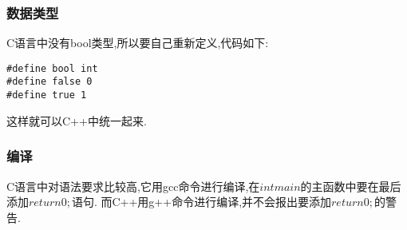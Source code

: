 \subsubsection{数据类型}
C语言中没有bool类型,所以要自己重新定义,代码如下:
\begin{lstlisting}[style=C]
#define bool int
#define false 0
#define true 1
\end{lstlisting}
这样就可以C++中统一起来.

\subsubsection{编译}
C语言中对语法要求比较高,它用gcc命令进行编译,在$int main$的主函数中要在最后添加$return 0;$语句.
而C++用g++命令进行编译,并不会报出要添加$return 0;$的警告.



















\clearpage
